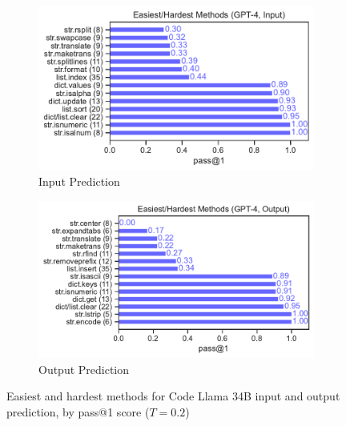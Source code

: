 \begin{figure}[H]
    \centering
    \begin{subfigure}[b]{0.49\textwidth}
        \includegraphics[width=\textwidth]{figs/benchmark/dataset_difficult_methods_gpt4_input.pdf}
        \caption{Input Prediction}
    \end{subfigure}
    \begin{subfigure}[b]{0.49\textwidth}
        \includegraphics[width=\textwidth]{figs/benchmark/dataset_difficult_methods_gpt4_output.pdf}
        \caption{Output Prediction}
    \end{subfigure}
    \caption{Easiest and hardest methods for Code Llama 34B input and output prediction, by pass@1 score ($T=0.2$)}
    \label{fig:dataset-difficult-gpt4}
\end{figure}